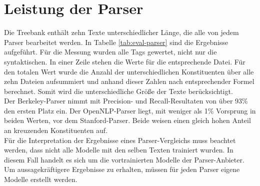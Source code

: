 \section{Leistung der Parser}
Die Treebank enthält zehn Texte unterschiedlicher Länge, die alle von jedem Parser bearbeitet werden. In Tabelle \ref{tab:eval-parser} sind die Ergebnisse aufgeführt. Für die Messung wurden alle Tags gewertet, nicht nur die syntaktischen. In einer Zeile stehen die Werte für die entsprechende Datei. Für den totalen Wert wurde die Anzahl der unterschiedlichen Konstituenten über alle zehn Dateien aufsummiert und anhand dieser Zahlen nach entsprechender Formel berechnet. Somit wird die unterschiedliche Größe der Texte berücksichtigt. \\
Der Berkeley-Parser nimmt mit Precision- und Recall-Resultaten von über 93\% den ersten Platz ein. Der OpenNLP-Parser liegt, mit weniger als 1\% Vorsprung in beiden Werten, vor dem Stanford-Parser. Beide weisen einen gleich hohen Anteil an kreuzenden Konstituenten auf.\\
Für die Interpretation der Ergebnisse eines Parser-Vergleichs muss beachtet werden, dass nicht alle Modelle mit den selben Texten trainiert wurden. In diesem Fall handelt es sich um die vortrainierten Modelle der Parser-Anbieter. Um aussagekräftigere Ergebnisse zu erhalten, müssen für jeden Parser eigene Modelle erstellt werden. 

